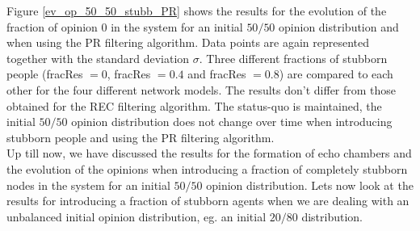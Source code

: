 \documentclass[11 pt , letterpaper , twoside , openright]{book}
\begin{document}
\noindent
Figure \ref{ev_op_50_50_stubb_PR} shows the results for the evolution of the fraction of opinion 0 in the system for an initial $50/50$ opinion distribution and when using the PR filtering algorithm. Data points are again represented together with the standard deviation $\sigma$. Three different fractions of stubborn people (fracRes $=0$, fracRes $=0.4$ and fracRes $=0.8$) are compared to each other for the four different network models. The results don't differ from those obtained for the REC filtering algorithm. The status-quo is maintained, the initial $50/50$ opinion distribution does not change over time when introducing stubborn people and using the PR filtering algorithm.\\
\newline
Up till now, we have discussed the results for the formation of echo chambers and the evolution of the opinions when introducing a fraction of completely stubborn nodes in the system for an initial $50/50$ opinion distribution. Lets now look at the results for introducing a fraction of stubborn agents when we are dealing with an unbalanced initial opinion distribution, eg. an initial $20/80$ distribution.\\
\newline
\end{document}
